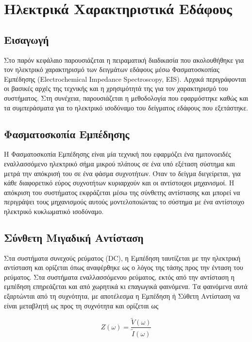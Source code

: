 \chapter{Ηλεκτρικά Χαρακτηριστικά Εδάφους}
\label{ch:electrical}

\section{Εισαγωγή}

Στο παρόν κεφάλαιο παρουσιάζεται η πειραματική διαδικασία που
ακολουθήθηκε για τον ηλεκτρικό χαρακτηρισμό των δειγμάτων εδάφους μέσω
Φασματοσκοπίας Εμπέδησης (Electrochemical Impedance Spectroscopy, EIS).
Αρχικά περιγράφονται οι βασικές αρχές της τεχνικής και η χρησιμότητά της
για τον χαρακτηρισμό του συστήματος. Στη συνέχεια, παρουσιάζεται η
μεθοδολογία που εφαρμόστηκε καθώς και τα συμπεράσματα για το ηλεκτρικό
ισοδύναμο του δείγματος εδάφους που εξετάστηκε.

\section{Φασματοσκοπία Εμπέδησης}

Η Φασματοσκοπία Εμπέδησης είναι μία τεχνική που εφαρμόζει ένα
ημιτονοειδές εναλλασσόμενο ηλεκτρικό σήμα μικρού πλάτους σε ένα υπό
εξέταση σύστημα και μετρά την απόκρισή του σε ένα φάσμα συχνοτήτων. Όταν
το δείγμα διεγείρεται, για κάθε διαφορετικό εύρος συχνοτήτων κυριαρχούν
και οι αντίστοιχοι μηχανισμοί. Η απόκριση του συστήματος εκφράζεται μέσω
της σύνθετης αντίστασης και μπορεί να περιγράψει τους μηχανισμούς αυτούς
μοντελοποιώντας το σύστημα με ένα αντίστοιχο ηλεκτρικό κυκλωματικό
ισοδύναμο. \cite{ref22}




\section{Σύνθετη Μιγαδική Αντίσταση}

Στα συστήματα συνεχούς ρεύματος (DC), η Εμπέδηση ταυτίζεται με την ηλεκτρική αντίσταση και ορίζεται όπως αναφέρθηκε ως ο λόγος της τάσης προς την ένταση του ρεύματος. Στα συστήματα εναλλασσόμενου ρεύματος, εκτός από την αντίσταση η εμπέδηση επηρεάζεται και από χωρητικά κι επαγωγικά φαινόμενα. Τα φαινόμενα αυτά εξαρτώνται από τη συχνότητα, με αποτέλεσμα η Εμπέδηση ή Σύθετη Αντίσταση να είναι μεταβλητή ως προς τη συχνότητα και ορίζεται ως

\[
Z(\omega) = \frac{\tilde{V}(\omega)}{\tilde{I}(\omega)}
\tag{3.1}\]

